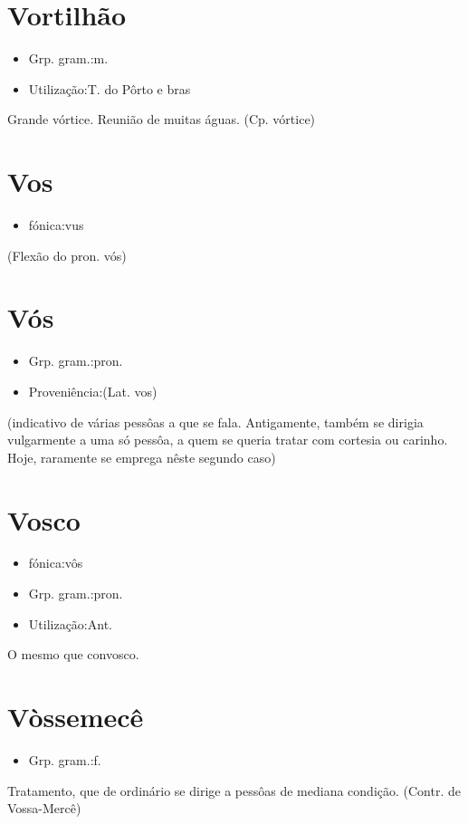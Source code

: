 \documentclass{article}
\begin{document}
\section{Vortilhão}
\begin{itemize}
\item {Grp. gram.:m.}
\end{itemize}
\begin{itemize}
\item {Utilização:T. do Pôrto  e  bras}
\end{itemize}
Grande vórtice.
Reunião de muitas águas.
(Cp. \textunderscore vórtice\textunderscore )
\section{Vos}
\begin{itemize}
\item {fónica:vus}
\end{itemize}
(Flexão do pron. \textunderscore vós\textunderscore )
\section{Vós}
\begin{itemize}
\item {Grp. gram.:pron.}
\end{itemize}
\begin{itemize}
\item {Proveniência:(Lat. \textunderscore vos\textunderscore )}
\end{itemize}
(indicativo de várias pessôas a que se fala. Antigamente, também se dirigia vulgarmente a uma só pessôa, a quem se queria tratar com cortesia ou carinho. Hoje, raramente se emprega nêste segundo caso)
\section{Vosco}
\begin{itemize}
\item {fónica:vôs}
\end{itemize}
\begin{itemize}
\item {Grp. gram.:pron.}
\end{itemize}
\begin{itemize}
\item {Utilização:Ant.}
\end{itemize}
O mesmo que \textunderscore convosco\textunderscore .
\section{Vòssemecê}
\begin{itemize}
\item {Grp. gram.:f.}
\end{itemize}
Tratamento, que de ordinário se dirige a pessôas de mediana condição.
(Contr. de \textunderscore Vossa-Mercê\textunderscore )
\end{document}
